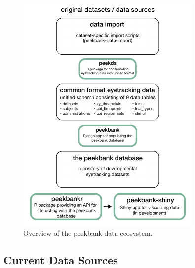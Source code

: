 \documentclass[10pt, letterpaper]{article}
\newenvironment{CodeChunk}{}{}
\begin{document}
\begin{CodeChunk}
\begin{figure}[tb]

{\centering \includegraphics{figs/fig.framework_overview-1} 

}

\caption[Overview of the peekbank data ecosystem]{Overview of the peekbank data ecosystem.}\label{fig:fig.framework_overview}
\end{figure}
\end{CodeChunk}

\hypertarget{current-data-sources}{%
\subsection{Current Data Sources}\label{current-data-sources}}
\end{document}
